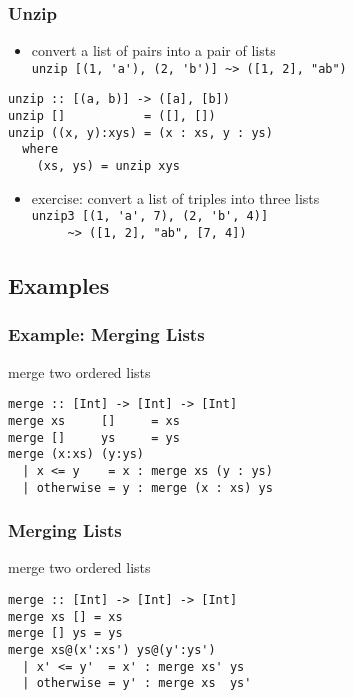 \documentclass[dvipsnames]{beamer}
\theoremstyle{plain}
\begin{document}
\begin{frame}[fragile]
  \frametitle{Unzip}

  \begin{itemize}
    \item convert a list of pairs into a pair of lists\\
      \lstinline[style=exclamfix]|unzip [(1, 'a'), (2, 'b')] ~> ([1, 2], "ab")|
  \end{itemize}

  \begin{exampleblock}{}
    \begin{lstlisting}[deletekeywords={unzip}]
unzip :: [(a, b)] -> ([a], [b])
unzip []           = ([], [])
unzip ((x, y):xys) = (x : xs, y : ys)
  where
    (xs, ys) = unzip xys
    \end{lstlisting}
  \end{exampleblock}

  \pause
  \begin{itemize}
    \item exercise: convert a list of triples into three lists\\
      \lstinline[style=exclamfix]|unzip3 [(1, 'a', 7), (2, 'b', 4)]|\\
      \lstinline[style=exclamfix]|     ~> ([1, 2], "ab", [7, 4])|
  \end{itemize}
\end{frame}

\subsection{Examples}

\begin{frame}[fragile]
  \frametitle{Example: Merging Lists}

  \begin{exampleblock}{merge two ordered lists}
    \begin{lstlisting}
merge :: [Int] -> [Int] -> [Int]
merge xs     []     = xs
merge []     ys     = ys
merge (x:xs) (y:ys)
  | x <= y    = x : merge xs (y : ys)
  | otherwise = y : merge (x : xs) ys
    \end{lstlisting}
  \end{exampleblock}
\end{frame}

\begin{frame}[fragile]
  \frametitle{Merging Lists}

  \begin{exampleblock}{merge two ordered lists}
    \begin{lstlisting}
merge :: [Int] -> [Int] -> [Int]
merge xs [] = xs
merge [] ys = ys
merge xs@(x':xs') ys@(y':ys')
  | x' <= y'  = x' : merge xs' ys
  | otherwise = y' : merge xs  ys'
    \end{lstlisting}
  \end{exampleblock}
\end{frame}
\end{document}
